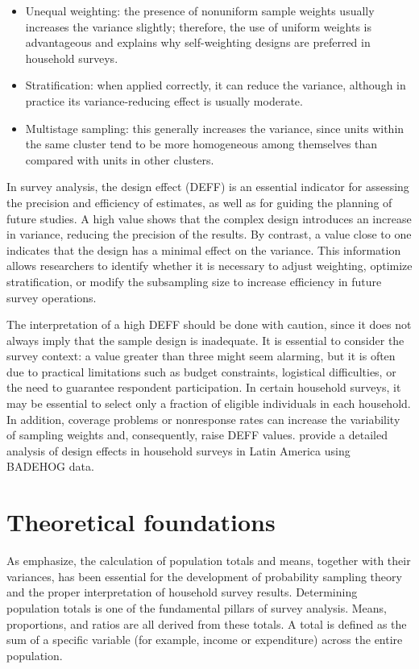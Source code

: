 \documentclass[
  english,
  12pt,
]{book}
\providecommand{\tightlist}{%
  \setlength{\itemsep}{0pt}\setlength{\parskip}{0pt}}
\begin{document}
\begin{itemize}
\tightlist
\item
  Unequal weighting: the presence of nonuniform sample weights usually increases the variance slightly; therefore, the use of uniform weights is advantageous and explains why self-weighting designs are preferred in household surveys.
\item
  Stratification: when applied correctly, it can reduce the variance, although in practice its variance-reducing effect is usually moderate.
\item
  Multistage sampling: this generally increases the variance, since units within the same cluster tend to be more homogeneous among themselves than compared with units in other clusters.
\end{itemize}

In survey analysis, the design effect (DEFF) is an essential indicator for assessing the precision and efficiency of estimates, as well as for guiding the planning of future studies. A high value shows that the complex design introduces an increase in variance, reducing the precision of the results. By contrast, a value close to one indicates that the design has a minimal effect on the variance. This information allows researchers to identify whether it is necessary to adjust weighting, optimize stratification, or modify the subsampling size to increase efficiency in future survey operations.

The interpretation of a high DEFF should be done with caution, since it does not always imply that the sample design is inadequate. It is essential to consider the survey context: a value greater than three might seem alarming, but it is often due to practical limitations such as budget constraints, logistical difficulties, or the need to guarantee respondent participation. In certain household surveys, it may be essential to select only a fraction of eligible individuals in each household. In addition, coverage problems or nonresponse rates can increase the variability of sampling weights and, consequently, raise DEFF values. \citet{GutierrezBabativa2023} provide a detailed analysis of design effects in household surveys in Latin America using BADEHOG data.

\section{Theoretical foundations}\label{fundamentos-teoricos}

As \citet{heeringa2017applied} emphasize, the calculation of population totals and means, together with their variances, has been essential for the development of probability sampling theory and the proper interpretation of household survey results. Determining population totals is one of the fundamental pillars of survey analysis. Means, proportions, and ratios are all derived from these totals. A total is defined as the sum of a specific variable (for example, income or expenditure) across the entire population.
\end{document}
